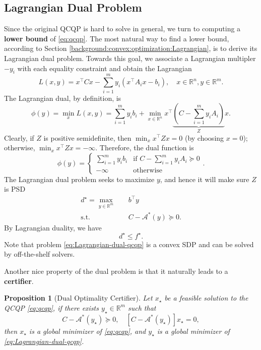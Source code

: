 \documentclass[
]{book}
\newtheorem{proposition}{Proposition}[chapter]
\theoremstyle{definition}
\theoremstyle{definition}
\theoremstyle{definition}
\theoremstyle{definition}
\theoremstyle{remark}
\begin{document}
\hypertarget{lagrangian-dual-problem}{%
\subsection{Lagrangian Dual Problem}\label{lagrangian-dual-problem}}

Since the original QCQP is hard to solve in general, we turn to computing a \textbf{lower bound} of \eqref{eq:qcqp}. The most natural way to find a lower bound, according to Section \ref{background:convex:optimization:Lagrangian}, is to derive its Lagrangian dual problem. Towards this goal, we associate a Lagrangian multipler \(-y_i\) with each equality constraint and obtain the Lagrangian
\[
L(x,y) = x^\top C x - \sum_{i=1}^m y_i (x^\top A_i x - b_i), \quad x \in \mathbb{R}^{n},y \in \mathbb{R}^{m}.
\]
The Lagrangian dual, by definition, is
\[
\phi(y) = \min_x L(x,y) = \sum_{i=1}^m y_i b_i + \min_{x \in \mathbb{R}^{n}} x^\top\underbrace{\left( C - \sum_{i=1}^m y_i A_i \right)}_{Z} x.
\]
Clearly, if \(Z\) is positive semidefinite, then \(\min_x x^\top Z x = 0\) (by choosing \(x=0\)); otherwise, \(\min_x x^\top Z x = -\infty\). Therefore, the dual function is
\[
\phi(y) = \begin{cases}
\sum_{i=1}^m y_i b_i & \text{if } C - \sum_{i=1}^m y_i A_i \succeq 0 \\
- \infty & \text{otherwise}
\end{cases}.
\]
The Lagrangian dual problem seeks to maximize \(y\), and hence it will make sure \(Z\) is PSD
\begin{equation}
\begin{split}
d^\star = \max_{y \in \mathbb{R}^{m}} & \quad b^\top y \\
\mathrm{s.t.}& \quad C - \mathcal{A}^*(y) \succeq 0.
\end{split}
\label{eq:Lagrangian-dual-qcqp}
\end{equation}
By Lagrangian duality, we have
\[
d^\star \leq f^\star.
\]
Note that problem \eqref{eq:Lagrangian-dual-qcqp} is a convex SDP and can be solved by off-the-shelf solvers.

Another nice property of the dual problem is that it naturally leads to a \textbf{certifier}.

\begin{proposition}[Dual Optimality Certifier]
\protect\hypertarget{prp:DualCertifier}{}\label{prp:DualCertifier}Let \(x_\star\) be a feasible solution to the QCQP \eqref{eq:qcqp}, if there exists \(y_\star \in \mathbb{R}^{m}\) such that
\begin{equation}
C - \mathcal{A}^*(y_\star) \succeq 0, \quad [ C - \mathcal{A}^*(y_\star) ] x_\star = 0,
\label{eq:dual-optimality-condition}
\end{equation}
then \(x_\star\) is a global minimizer of \eqref{eq:qcqp}, and \(y_\star\) is a global minimizer of \eqref{eq:Lagrangian-dual-qcqp}.
\end{proposition}
\end{document}
